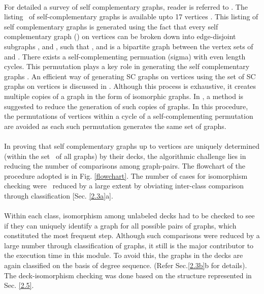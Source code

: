 \documentclass[12pt,conference]{IEEEtran}
\begin{document}
\paragraph*{} For detailed a survey of self complementary graphs, reader is referred to \cite{f2}. The listing  of self-complementary graphs is available upto 17 vertices \cite{b6}. This listing of self complementary graphs is generated using the fact that every self complementary graph () on  vertices can be broken down into edge-disjoint subgraphs ,  and , such that  ,  and  is a bipartite graph between the vertex sets of  and . There exists a self-complementing permuation (sigma) with even length  cycles. This permutation plays a key role in generating the self complementary graphs \cite{n3}. An efficient way of generating SC graphs on  vertices using the set of SC graphs on  vertices is discussed in \cite{x1}. Although this process is exhaustive, it creates multiple copies of a graph in the form of isomorphic graphs. In \cite{m3} , a method is suggested to reduce the generation of such copies of graphs. In this procedure, the permutations of vertices within a cycle of a self-complementing permutation are avoided as each such permutation generates the same set of graphs.
\paragraph*{} In proving that self complementary graphs up to  vertices are uniquely determined (within the set  of  all graphs) by their decks, the algorithmic challenge lies in reducing the number of comparisons among graph-pairs. The flowchart of the procedure adopted is in Fig. \ref{flowchart}. The number of cases for isomorphism checking were  reduced by a large extent by obviating inter-class comparison through classification [Sec. \ref{2.3a}a]. 
\paragraph*{} Within each class, isomorphism among unlabeled decks had to be checked to see if they can uniquely identify a graph for all possible pairs of graphs, which constituted the most frequent step. Although such comparisons were reduced by a large number through classification of graphs, it still is the major contributor to the execution time in this module. To avoid this, the graphs in the decks are again classified on the basis of degree sequence. (Refer Sec.\ref{2.3b}b for details). The deck-isomorphism checking was done based on the structure represented in Sec. \ref{2.5}. 
\end{document}
